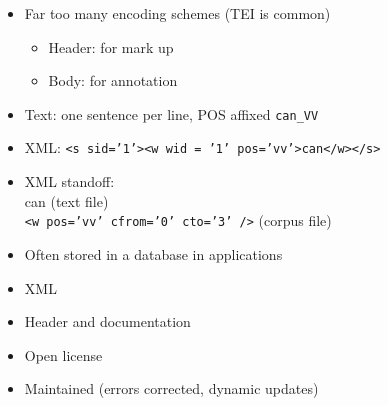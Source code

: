 \documentclass[a4paper,landscape,headrule,footrule,dvips]{foils}
\begin{document}
\begin{CJK}{UTF8}{min}
\begin{itemize}
\item Far too many encoding schemes (TEI is common)
  \begin{itemize}
  \item Header: for mark up
  \item Body: for annotation
  \end{itemize}
\item Text: one sentence per line, POS affixed \texttt{can\_VV}
\item XML: \texttt{<s sid='1'><w wid = '1' pos='vv'>can</w></s>}
\item XML standoff: 
  \\ can \hfill (text file)
  \\ \texttt{<w pos='vv' cfrom='0' cto='3' />} \hfill (corpus file)
\item Often stored in a database in applications

\end{itemize}


\begin{itemize}
\item XML
\item Header and documentation
\item Open license
\item Maintained (errors corrected, dynamic updates)
\end{itemize}



\end{CJK}
\end{document}
